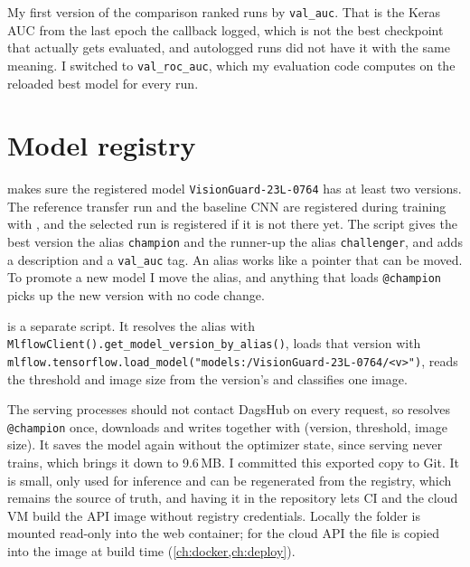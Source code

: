 My first version of the comparison ranked runs by \texttt{val\_auc}. That is the Keras AUC from the
last epoch the callback logged, which is not the best checkpoint that actually gets evaluated, and
autologged runs did not have it with the same meaning. I switched to \texttt{val\_roc\_auc}, which
my evaluation code computes on the reloaded best model for every run.

\section{Model registry}
 makes sure the registered model \texttt{VisionGuard-23L-0764} has
at least two versions. The reference transfer run and the baseline CNN are registered during
training with , and the selected run is registered if it is not there yet. The
script gives the best version the alias \texttt{champion} and the runner-up the alias
\texttt{challenger}, and adds a description and a \texttt{val\_auc} tag. An alias works like a
pointer that can be moved. To promote a new model I move the alias, and anything that loads
\texttt{@champion} picks up the new version with no code change.


 is a separate script. It resolves the alias with
\texttt{MlflowClient().get\_model\_version\_by\_alias()}, loads that version with
\texttt{mlflow.tensorflow.load\_model("models:/VisionGuard-23L-0764/<v>")}, reads the threshold and
image size from the version's  and classifies one image.


The serving processes should not contact DagsHub on every request, so
 resolves \texttt{@champion} once, downloads  and
writes  together with  (version, threshold, image
size). It saves the model again without the optimizer state, since serving never trains, which
brings it down to 9.6\,MB. I committed this exported copy to Git. It is small, only used for
inference and can be regenerated from the registry, which remains the source of truth, and having
it in the repository lets CI and the cloud VM build the API image without registry credentials.
Locally the  folder is mounted read-only into the web container; for the cloud API
the file is copied into the image at build time (\cref{ch:docker,ch:deploy}).
